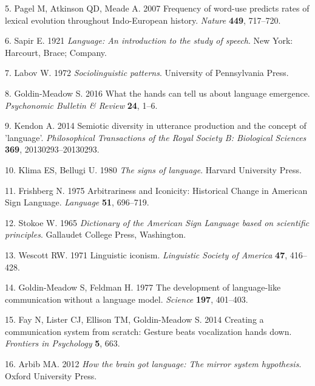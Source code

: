 \documentclass[english,floatsintext,man]{apa6}
\theoremstyle{definition}
\theoremstyle{definition}
\theoremstyle{definition}
\theoremstyle{remark}
\begin{document}
\leavevmode\hypertarget{ref-Pagel:2007br}{}%
5. Pagel M, Atkinson QD, Meade A. 2007 Frequency of word-use predicts
rates of lexical evolution throughout Indo-European history.
\emph{Nature} \textbf{449}, 717--720.

\leavevmode\hypertarget{ref-Sapir:1921}{}%
6. Sapir E. 1921 \emph{Language: An introduction to the study of
speech}. New York: Harcourt, Brace; Company.

\leavevmode\hypertarget{ref-Labov:1972}{}%
7. Labov W. 1972 \emph{Sociolinguistic patterns}. University of
Pennsylvania Press.

\leavevmode\hypertarget{ref-GoldinMeadow:2016bw}{}%
8. Goldin-Meadow S. 2016 What the hands can tell us about language
emergence. \emph{Psychonomic Bulletin \& Review} \textbf{24}, 1--6.

\leavevmode\hypertarget{ref-Kendon:2014eg}{}%
9. Kendon A. 2014 Semiotic diversity in utterance production and the
concept of 'language'. \emph{Philosophical Transactions of the Royal
Society B: Biological Sciences} \textbf{369}, 20130293--20130293.

\leavevmode\hypertarget{ref-Klima:1980si}{}%
10. Klima ES, Bellugi U. 1980 \emph{The signs of language}. Harvard
University Press.

\leavevmode\hypertarget{ref-Frishberg:1975dh}{}%
11. Frishberg N. 1975 Arbitrariness and Iconicity: Historical Change in
American Sign Language. \emph{Language} \textbf{51}, 696--719.

\leavevmode\hypertarget{ref-Stokoe:1965}{}%
12. Stokoe W. 1965 \emph{Dictionary of the American Sign Language based
on scientific principles}. Gallaudet College Press, Washington.

\leavevmode\hypertarget{ref-Wescott:1971to}{}%
13. Wescott RW. 1971 Linguistic iconism. \emph{Linguistic Society of
America} \textbf{47}, 416--428.

\leavevmode\hypertarget{ref-GoldinMeadow:1977gz}{}%
14. Goldin-Meadow S, Feldman H. 1977 The development of language-like
communication without a language model. \emph{Science} \textbf{197},
401--403.

\leavevmode\hypertarget{ref-Fay:2014cw}{}%
15. Fay N, Lister CJ, Ellison TM, Goldin-Meadow S. 2014 Creating a
communication system from scratch: Gesture beats vocalization hands
down. \emph{Frontiers in Psychology} \textbf{5}, 663.

\leavevmode\hypertarget{ref-Arbib:2012htb}{}%
16. Arbib MA. 2012 \emph{How the brain got language: The mirror system
hypothesis}. Oxford University Press.
\end{document}
